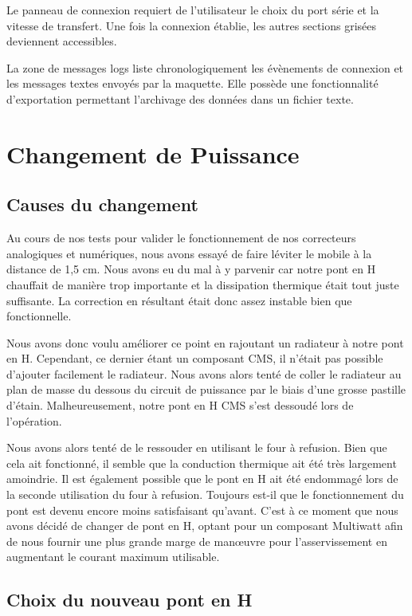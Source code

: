 \documentclass[11pt, french]{article} %
\begin{document}
Le panneau de connexion requiert de l'utilisateur le choix du port série et la vitesse de transfert. Une fois la connexion établie, les autres sections grisées deviennent accessibles. 

La zone de messages logs liste chronologiquement les évènements de connexion et les messages textes envoyés par la maquette. Elle possède une fonctionnalité d'exportation permettant l'archivage des données dans un fichier texte.

\section{Changement de Puissance}

\subsection{Causes du changement}
Au cours de nos tests pour valider le fonctionnement de nos correcteurs analogiques et numériques, nous avons essayé de faire léviter le mobile à la distance de 1,5 cm. Nous avons eu du mal à y parvenir car notre pont en H chauffait de manière trop importante et la dissipation thermique était tout juste suffisante. La correction en résultant était donc assez instable bien que fonctionnelle. 

Nous avons donc voulu améliorer ce point en rajoutant un radiateur à notre pont en H. Cependant, ce dernier étant un composant CMS, il n'était pas possible d'ajouter facilement le radiateur. Nous avons alors tenté de coller le radiateur au plan de masse du dessous du circuit de puissance par le biais d'une grosse pastille d'étain. Malheureusement, notre pont en H CMS s'est dessoudé lors de l'opération.

Nous avons alors tenté de le ressouder en utilisant le four à refusion. Bien que cela ait fonctionné, il semble que la conduction thermique ait été très largement amoindrie. Il est également possible que le pont en H ait été endommagé lors de la seconde utilisation du four à refusion. Toujours est-il que le fonctionnement du pont est devenu encore moins satisfaisant qu'avant. C'est à ce moment que nous avons décidé de changer de pont en H, optant pour un composant Multiwatt afin de nous fournir une plus grande marge de manœuvre pour l'asservissement en augmentant le courant maximum utilisable. 

\subsection{Choix du nouveau pont en H}
\end{document}
